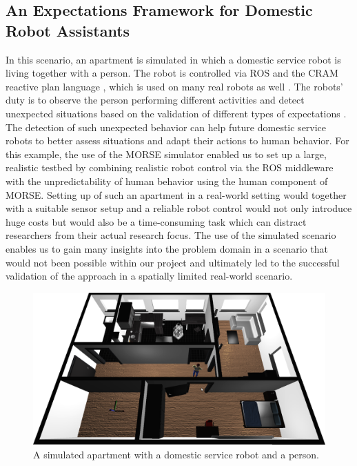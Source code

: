 \documentclass[conference]{IEEEtran}
\begin{document}
\subsection{An Expectations Framework for Domestic Robot Assistants}
\label{scenario2}

In this scenario, an apartment is simulated in which a domestic service robot is
living together with a person. The robot is controlled via ROS and the CRAM
reactive plan language \cite{beetz2010cram}, which is used on many real robots
as well \cite{pancakes11humanoids}. The robots' duty is to observe the person
performing different activities and detect unexpected situations based on the
validation of different types of expectations \cite{Karg2013}. The detection of
such unexpected behavior can help future domestic service robots to better
assess situations and adapt their actions to human behavior. For this example,
the use of the MORSE simulator enabled us to set up a large, realistic testbed
by combining realistic robot control via the ROS middleware with the
unpredictability of human behavior using the human component of MORSE. Setting
up of such an apartment in a real-world setting would together with a suitable
sensor setup and a reliable robot control would not only introduce huge costs
but would also be a time-consuming task which can distract researchers from
their actual research focus. The use of the simulated scenario enables us to
gain many insights into the problem domain in a scenario that would not been
possible within our project and ultimately led to the successful validation of
the approach in a spatially limited real-world scenario.

\begin{figure}[H]
      \centering
      \includegraphics[width=0.9\linewidth]{morse_apartment.png}
      \caption{A simulated apartment with a domestic service robot and a person.}
      \label{fig|apartment}
\end{figure}
\end{document}
